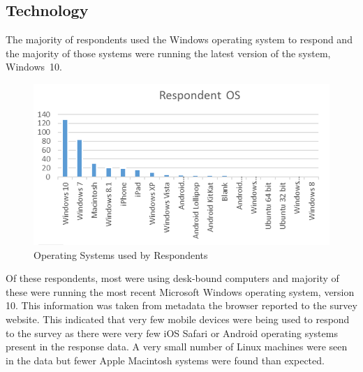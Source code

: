 \subsection{Technology}
The majority of respondents used the Windows operating system to respond and the majority of those systems were running the latest version of the system, Windows~10. 
\begin{figure}
\centering
\includegraphics[scale=1]{figures/Survey-OS.png} 
\caption{Operating Systems used by Respondents}
\label{fig:surveyOS}
\end{figure}
Of these respondents, most were using desk-bound computers and majority of these were running the most recent Microsoft Windows operating system, version 10. This information was taken from metadata the browser reported to the survey website. This indicated that very few mobile devices were being used to respond to the survey as there were very few iOS Safari or Android operating systems present in the response data. A very small number of Linux machines were seen in the data but fewer Apple Macintosh systems were found than expected. 



